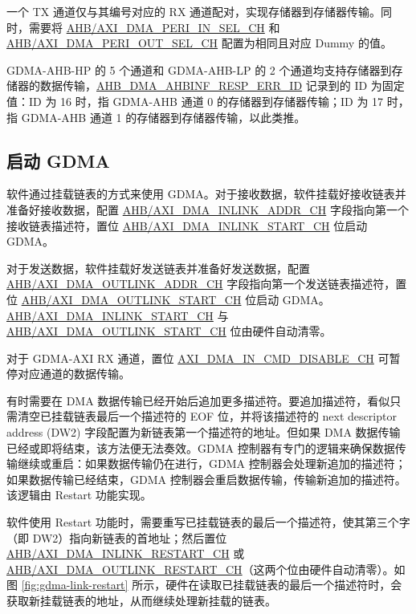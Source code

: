 \documentclass[main\_\_CN.tex]{subfiles}
\begin{document}
一个 TX 通道仅与其编号对应的 RX 通道配对，实现存储器到存储器传输。同时，需要将 \hyperref[fielddesc:AHBDMAPERIINSELCHN]{AHB/AXI\_DMA\_PERI\_IN\_SEL\_CH} 和 \hyperref[fielddesc:AHBDMAPERIOUTSELCHN]{AHB/AXI\_DMA\_PERI\_OUT\_SEL\_CH} 配置为相同且对应 Dummy 的值。

GDMA-AHB-HP 的 5 个通道和 GDMA-AHB-LP 的 2 个通道均支持存储器到存储器的数据传输，\hyperref[fielddesc:AHBDMAAHBINFRESPERRID]{AHB\_DMA\_AHBINF\_RESP\_ERR\_ID} 记录到的 ID 为固定值：ID 为 16 时，指 GDMA-AHB 通道 0 的存储器到存储器传输；ID 为 17 时，指 GDMA-AHB 通道 1 的存储器到存储器传输，以此类推。

\subsection{启动 GDMA}

软件通过挂载链表的方式来使用 GDMA。对于接收数据，软件挂载好接收链表并准备好接收数据，配置 \hyperref[fielddesc:AHBDMAINLINKADDRCHN]{AHB/AXI\_DMA\_INLINK\_ADDR\_CH} 字段指向第一个接收链表描述符，置位 \hyperref[fielddesc:AHBDMAINLINKSTARTCHN]{AHB/AXI\_DMA\_INLINK\_START\_CH} 位启动 GDMA。

对于发送数据，软件挂载好发送链表并准备好发送数据，配置 \hyperref[fielddesc:AHBDMAOUTLINKADDRCHN]{AHB/AXI\_DMA\_OUTLINK\_ADDR\_CH} 字段指向第一个发送链表描述符，置位 \hyperref[fielddesc:AHBDMAOUTLINKSTARTCHN]{AHB/AXI\_DMA\_OUTLINK\_START\_CH} 位启动 GDMA。\hyperref[fielddesc:AHBDMAINLINKSTARTCHN]{AHB/AXI\_DMA\_INLINK\_START\_CH} 与 \hyperref[fielddesc:AHBDMAOUTLINKSTARTCHN]{AHB/AXI\_DMA\_OUTLINK\_START\_CH} 位由硬件自动清零。

对于 GDMA-AXI RX 通道，置位 \hyperref[fielddesc:AXIDMAINCMDDISABLECHN]{AXI\_DMA\_IN\_CMD\_DISABLE\_CH} 可暂停对应通道的数据传输。

有时需要在 DMA 数据传输已经开始后追加更多描述符。要追加描述符，看似只需清空已挂载链表最后一个描述符的 EOF 位，并将该描述符的 next descriptor address (DW2) 字段配置为新链表第一个描述符的地址。但如果 DMA 数据传输已经或即将结束，该方法便无法奏效。GDMA 控制器有专门的逻辑来确保数据传输继续或重启：如果数据传输仍在进行，GDMA 控制器会处理新追加的描述符；如果数据传输已经结束，GDMA 控制器会重启数据传输，传输新追加的描述符。该逻辑由 Restart 功能实现。

软件使用 Restart 功能时，需要重写已挂载链表的最后一个描述符，使其第三个字（即 DW2）指向新链表的首地址；然后置位 \hyperref[fielddesc:AHBDMAINLINKRESTARTCHN]{AHB/AXI\_DMA\_INLINK\_RESTART\_CH} 或 \hyperref[fielddesc:AHBDMAOUTLINKRESTARTCHN]{AHB/AXI\_DMA\_OUTLINK\_RESTART\_CH}（这两个位由硬件自动清零）。如图 \ref{fig:gdma-link-restart} 所示，硬件在读取已挂载链表的最后一个描述符时，会获取新挂载链表的地址，从而继续处理新挂载的链表。
\end{document}
